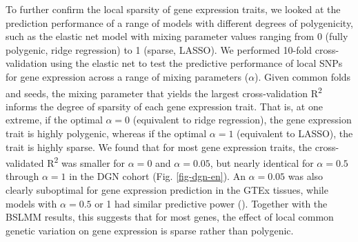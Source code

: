 \documentclass[10pt,letterpaper]{article}
\begin{document}
To further confirm the local sparsity of gene expression traits, we looked at the prediction performance of a range of models with different degrees of polygenicity, such as the elastic net model with mixing parameter values ranging from 0 (fully polygenic, ridge regression) to 1 (sparse, LASSO). We performed 10-fold cross-validation using the elastic net \cite{Zou_2005} to test the predictive performance of local SNPs for gene expression across a range of mixing parameters ($\alpha$). Given common folds and seeds, the mixing parameter that yields the largest cross-validation R\textsuperscript{2} informs the degree of sparsity of each gene expression trait. That is, at one extreme, if the optimal \(\alpha=0\) (equivalent to ridge regression), the gene expression trait is highly polygenic, whereas if the optimal \(\alpha=1\) (equivalent to LASSO), the trait is highly sparse. We found that for most gene expression traits, the cross-validated R\textsuperscript{2} was smaller for \(\alpha=0\) and \(\alpha=0.05\), but nearly identical for \(\alpha=0.5\) through \(\alpha=1\) in the DGN cohort (Fig. \ref{fig-dgn-en}). An \(\alpha=0.05\) was also clearly suboptimal for gene expression prediction in the GTEx tissues, while models with \(\alpha=0.5\) or 1 had similar predictive power (). Together with the BSLMM results, this suggests that for most genes, the effect of local common genetic variation on gene expression is sparse rather than polygenic.
\end{document}
